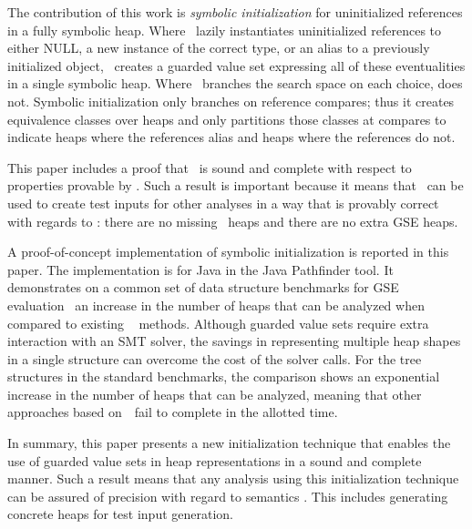 The contribution of this work is \emph{symbolic initialization} for 
uninitialized references in a fully symbolic heap. Where \gsetxt\ lazily
instantiates uninitialized references to either NULL, a new instance
of the correct type, or an alias to a previously initialized object, \symtxt\ creates a guarded value set
expressing all of these eventualities in a single symbolic heap. Where
\gsetxt\ branches the search space on each choice, \symtxt{} does not. Symbolic initialization only branches on reference compares; thus it creates equivalence classes over heaps and only partitions those classes at compares to indicate heaps where the references
alias and heaps where the references do not.

This paper includes a proof that \symtxt\ is sound and
complete with respect to properties provable by \gsetxt. Such a result is
important because it means that \symtxt\ can be used to
create test inputs for other analyses in a way that is provably
correct with regards to \gsetxt: there are no missing \gsetxt\ heaps and there are
no extra GSE heaps.

A proof-of-concept implementation of symbolic initialization is
reported in this paper. The implementation is for Java in the Java
Pathfinder tool. It demonstrates on a common set of data structure benchmarks for GSE evaluation~\cite{Deng:2006,Deng:2007,boyapati2002korat,Ferrara:2014,Rosner:2015} an increase in the number of heaps that can be analyzed when compared to existing ~\gsetxt{} methods. Although guarded value
sets require extra interaction with an SMT solver, the
savings in representing multiple heap shapes in a single
structure can overcome the cost of the solver calls. For the tree structures in the standard benchmarks, the
comparison shows an exponential increase in the number of heaps that
can be analyzed, meaning that other
approaches based on~\gsetxt\ fail to complete in the allotted time.

In summary, this paper presents a new initialization technique that
enables the use of guarded value sets in heap representations in a
sound and complete manner. Such a result means that any analysis using
this initialization technique can be assured of precision with regard
to \gsetxt{} semantics \cite{THINGSTHATBENEFIT}. This includes generating concrete heaps for test input generation.
